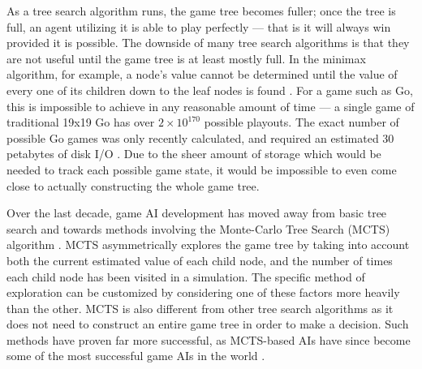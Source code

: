 As a tree search algorithm runs, the game tree becomes fuller; once the tree is full, an agent utilizing it is able to play perfectly --- that is it will always win provided it is possible.  The downside of many tree search algorithms is that they are not useful until the game tree is at least mostly full.  In the minimax algorithm, for example, a node's value cannot be determined until the value of every one of its children down to the leaf nodes is found \cite{minimax}.  For a game such as Go, this is impossible to achieve in any reasonable amount of time --- a single game of traditional 19x19 Go has over $2 \times 10^{170}$ possible playouts.  The exact number of possible Go games was only recently calculated, and required an estimated 30 petabytes of disk I/O \cite{Trompfinal}.  Due to the sheer amount of storage which would be needed to track each possible game state, it would be impossible to even come close to actually constructing the whole game tree.

Over the last decade, game AI development has moved away from basic tree search and towards methods involving the Monte-Carlo Tree Search (MCTS) algorithm \cite{browne2012survey}.  MCTS asymmetrically explores the game tree by taking into account both the current estimated value of each child node, and the number of times each child node has been visited in a simulation.  The specific method of exploration can be customized by considering one of these factors more heavily than the other.  MCTS is also different from other tree search algorithms as it does not need to construct an entire game tree in order to make a decision.  Such methods have proven far more successful, as MCTS-based AIs have since become some of the most successful game AIs in the world \cite{alphago}\cite{benzene}.

